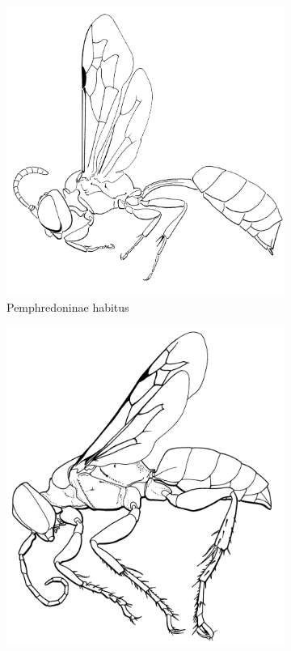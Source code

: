 \documentclass[letterpaper, 11pt]{article}
\begin{document}
\begin{figure}[ht!]
    \centering
    \begin{subfigure}[ht!]{0.4\textwidth}
        \includegraphics[width=\textwidth]{CrabronidHabitus1}
        \caption{Pemphredoninae habitus \citep[][Fig. 99]{goulet1993hymenoptera}}
        \label{fig:crabronid1}
    \end{subfigure}
    \qquad
    \begin{subfigure}[ht!]{0.4\textwidth}
        \includegraphics[width=\textwidth]{CrabronidHabitus2}

\end{subfigure}
\end{figure}
\end{document}

